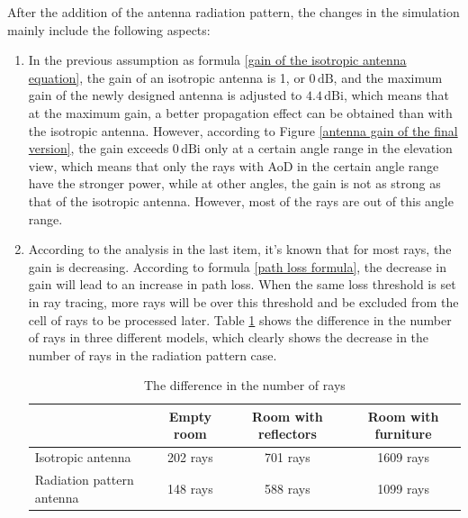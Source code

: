 \documentclass[12pt,DIV14,BCOR12mm,a4paper,footinclude=false,headinclude,parskip=half-,twoside,openright,cleardoublepage=empty,toc=index,bibliography=totoc,listof=totoc]{scrreprt}
\numberwithin{equation}{chapter}
\begin{document}
After the addition of the antenna radiation pattern, the changes in the simulation mainly include the following aspects:

\begin{enumerate}[label=\textbullet]
    \item In the previous assumption as formula \ref{gain of the isotropic antenna equation}, the gain of an isotropic antenna is 1, or $0\,\mathrm{dB}$, and the maximum gain of the newly designed antenna is adjusted to $4.4\,\mathrm{dBi}$, which means that at the maximum gain, a better propagation effect can be obtained than with the isotropic antenna. However, according to Figure \ref{antenna gain of the final version}, the gain exceeds $0\,\mathrm{dBi}$ only at a certain angle range in the elevation view, which means that only the rays with AoD in the certain angle range have the stronger power, while at other angles, the gain is not as strong as that of the isotropic antenna. However, most of the rays are out of this angle range.

    \item According to the analysis in the last item, it's known that for most rays, the gain is decreasing. According to formula \ref{path loss formula}, the decrease in gain will lead to an increase in path loss. When the same loss threshold is set in ray tracing, more rays will be over this threshold and be excluded from the cell of rays to be processed later. Table \ref{difference in the amount of rays} shows the difference in the number of rays in three different models, which clearly shows the decrease in the number of rays in the radiation pattern case.

    \begin{table}
    \centering
    \caption{The difference in the number of rays}
    \label{difference in the amount of rays}
    \begin{tabular}{lccccc{1cm}}
        \hline
        \multicolumn{1}{l|}{} & \multicolumn{1}{c|}{Empty room} & \multicolumn{3}{c|}{Room with reflectors} & \multicolumn{1}{c}{Room with furniture}\\
        \hline

        \multicolumn{1}{l|}{Isotropic antenna} & \multicolumn{1}{c|}{202 rays} & \multicolumn{3}{c|}{701 rays} & \multicolumn{1}{c}{1609 rays}\\
        \hline

        \multicolumn{1}{l|}{Radiation pattern antenna} & \multicolumn{1}{c|}{148 rays} & \multicolumn{3}{c|}{588 rays} & \multicolumn{1}{c}{1099 rays}\\
        \hline
    \end{tabular}
    \end{table}


\end{enumerate}
\end{document}
